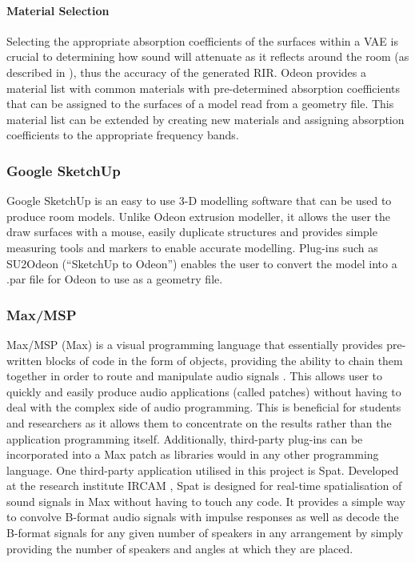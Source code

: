 \documentclass[../../main.tex]{subfiles}
\begin{document}
		\paragraph{Material Selection}

			Selecting the appropriate absorption coefficients of the surfaces within a \ac{VAE} is crucial to determining how sound will attenuate as it reflects around the room (as described in ), thus the accuracy of the generated \ac{RIR}. Odeon provides a material list with common materials with pre-determined absorption coefficients that can be assigned to the surfaces of a model read from a geometry file. This material list can be extended by creating new materials and assigning absorption coefficients to the appropriate frequency bands.

	\subsubsection{Google SketchUp}\label{GSU}
		Google SketchUp \cite{SKU} is an easy to use 3-D modelling software that can be used to produce room models. Unlike Odeon extrusion modeller, it allows the user the draw surfaces with a mouse, easily duplicate structures and provides simple measuring tools and markers to enable accurate modelling. Plug-ins such as SU2Odeon (``SketchUp to Odeon'') \cite{SU2Odeon} enables the user to convert the model into a .par file for Odeon to use as a geometry file.

	\subsubsection{Max/MSP}
		Max/MSP (Max) is a visual programming language that essentially provides pre-written blocks of code in the form of objects, providing the ability to chain them together in order to route and manipulate audio signals \cite{max}. This allows user to quickly and easily produce audio applications (called patches) without having to deal with the complex side of audio programming. This is beneficial for students and researchers as it allows them to concentrate on the results rather than the application programming itself. Additionally, third-party plug-ins can be incorporated into a Max patch as libraries would in any other programming language. One third-party application utilised in this project is Spat. Developed at the research institute IRCAM \cite{spat}, Spat is designed for real-time spatialisation of sound signals in Max without having to touch any code. It provides a simple way to convolve B-format audio signals with impulse responses as well as decode the B-format signals for any given number of speakers in any arrangement by simply providing the number of speakers and angles at which they are placed.
\end{document}
